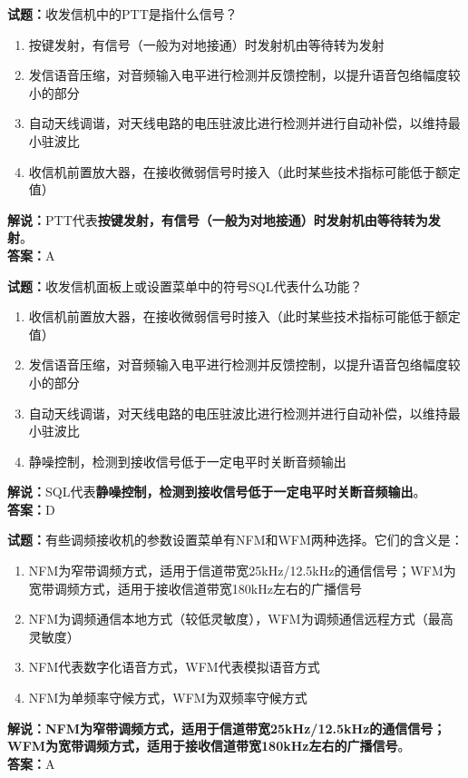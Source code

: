 \documentclass{ctexbook}
\begin{document}
\bigskip


\noindent\textbf{试题：}收发信机中的PTT是指什么信号？
\begin{enumerate}[leftmargin=3em]
\item 按键发射，有信号（一般为对地接通）时发射机由等待转为发射
\item 发信语音压缩，对音频输入电平进行检测并反馈控制，以提升语音包络幅度较小的部分
\item 自动天线调谐，对天线电路的电压驻波比进行检测并进行自动补偿，以维持最小驻波比
\item 收信机前置放大器，在接收微弱信号时接入（此时某些技术指标可能低于额定值）
\end{enumerate}
\noindent\textbf{解说：}PTT代表\textbf{按键发射，有信号（一般为对地接通）时发射机由等待转为发射}。\\\noindent\textbf{答案：}A



\bigskip


\noindent\textbf{试题：}收发信机面板上或设置菜单中的符号SQL代表什么功能？
\begin{enumerate}[leftmargin=3em]
\item 收信机前置放大器，在接收微弱信号时接入（此时某些技术指标可能低于额定值）
\item 发信语音压缩，对音频输入电平进行检测并反馈控制，以提升语音包络幅度较小的部分
\item 自动天线调谐，对天线电路的电压驻波比进行检测并进行自动补偿，以维持最小驻波比
\item 静噪控制，检测到接收信号低于一定电平时关断音频输出
\end{enumerate}
\noindent\textbf{解说：}SQL代表\textbf{静噪控制，检测到接收信号低于一定电平时关断音频输出}。\\\noindent\textbf{答案：}D



\bigskip


\noindent\textbf{试题：}有些调频接收机的参数设置菜单有NFM和WFM两种选择。它们的含义是：
\begin{enumerate}[leftmargin=3em]
\item NFM为窄带调频方式，适用于信道带宽25\unit{\kHz}/12.5\unit{\kHz}的通信信号；WFM为宽带调频方式，适用于接收信道带宽180\unit{\kHz}左右的广播信号
\item NFM为调频通信本地方式（较低灵敏度），WFM为调频通信远程方式（最高灵敏度）
\item NFM代表数字化语音方式，WFM代表模拟语音方式
\item NFM为单频率守候方式，WFM为双频率守候方式
\end{enumerate}
\noindent\textbf{解说：NFM为窄带调频方式，适用于信道带宽25\unit{\kHz}/12.5\unit{\kHz}的通信信号；WFM为宽带调频方式，适用于接收信道带宽180\unit{\kHz}左右的广播信号}。\\\noindent\textbf{答案：}A
\end{document}
